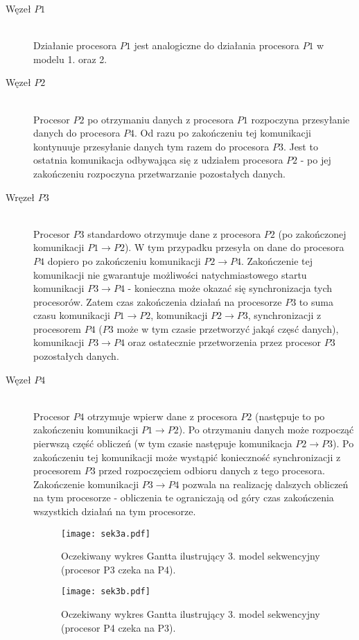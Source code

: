 \begin{description}

\item[Węzeł $P1$] \hfill \\

Działanie procesora $P1$ jest analogiczne do działania procesora $P1$ w modelu 1. oraz 2.

\item[Węzeł $P2$] \hfill \\

Procesor $P2$ po otrzymaniu danych z procesora $P1$ rozpoczyna przesyłanie danych do procesora $P4$. Od razu po zakończeniu tej komunikacji kontynuuje przesyłanie danych tym razem do procesora $P3$. Jest to ostatnia komunikacja odbywająca się z udziałem procesora $P2$ - po jej zakończeniu rozpoczyna przetwarzanie pozostałych danych.
 
\item[Wręzeł $P3$] \hfill \\

Procesor $P3$ standardowo otrzymuje dane z procesora $P2$ (po zakończonej komunikacji $P1 \to P2$). W tym przypadku przesyła on dane do procesora $P4$ dopiero po zakończeniu komunikacji $P2 \to P4$. Zakończenie tej komunikacji nie gwarantuje możliwości natychmiastowego startu komunikacji $P3 \to P4$ - konieczna może okazać się synchronizacja tych procesorów. Zatem czas zakończenia działań na procesorze $P3$ to suma czasu komunikacji $P1 \to P2$, komunikacji $P2 \to P3$, synchronizacji z procesorem $P4$ ($P3$ może w tym czasie przetworzyć jakąś częsć danych), komunikacji $P3 \to P4$ oraz ostatecznie przetworzenia przez procesor $P3$ pozostałych danych.

\item[Węzeł $P4$] \hfill \\

Procesor $P4$ otrzymuje wpierw dane z procesora $P2$ (następuje to po zakończeniu komunikacji $P1 \to P2$). Po otrzymaniu danych może rozpocząć pierwszą część obliczeń (w tym czasie następuje komunikacja $P2 \to P3$). Po zakończeniu tej komunikacji może wystąpić konieczność synchronizacji z procesorem $P3$ przed rozpoczęciem odbioru danych z tego procesora. Zakończenie komunikacji $P3 \to P4$ pozwala na realizację dalszych obliczeń na tym procesorze - obliczenia te ograniczają od góry czas zakończenia wszystkich działań na tym procesorze. 

\begin{figure}[!ht]
\centering
\texttt{[image: sek3a.pdf]}
\caption{Oczekiwany wykres Gantta ilustrujący 3. model sekwencyjny (procesor P3 czeka na P4).}
\label{fig:seq3a}
\end{figure}

\begin{figure}[!ht]
\centering
\texttt{[image: sek3b.pdf]}
\caption{Oczekiwany wykres Gantta ilustrujący 3. model sekwencyjny (procesor P4 czeka na P3).}
\label{fig:seq3b}
\end{figure}

\end{description}

